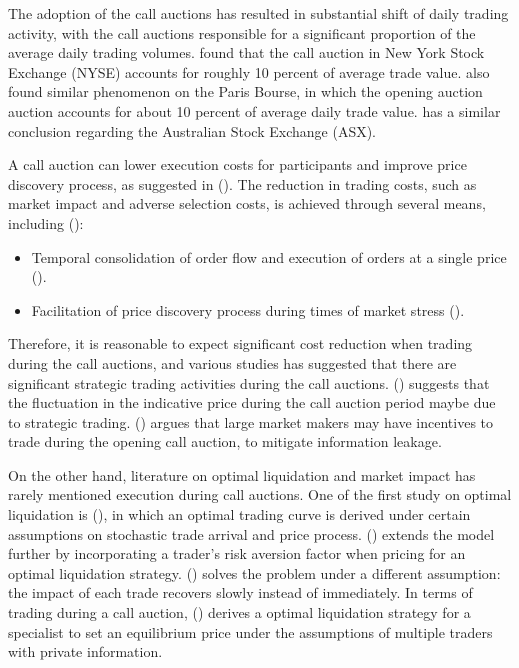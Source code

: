 \documentclass{article}
\begin{document}
The adoption of the call auctions has resulted in substantial shift of daily trading activity, with the call auctions responsible for a significant proportion of the average daily trading volumes. \cite{Madhavan2015} found that the call auction in New York Stock Exchange (NYSE) accounts for roughly 10 percent of average trade value. \cite{Bruno1999} also found similar phenomenon on the Paris Bourse, in which the opening auction auction accounts for about 10 percent of average daily trade value. \cite{Carole2006} has a similar conclusion regarding the Australian Stock Exchange (ASX).

A call auction can lower execution costs for participants and improve price discovery process, as suggested in (\cite{Pagano2003}). The reduction in trading costs, such as market impact and adverse selection costs, is achieved through several means, including (\cite{Carole2006}):
\begin{itemize}
\item Temporal consolidation of order flow and execution of orders at a single price (\cite{Economides1995}).
\item Facilitation of price discovery process during times of market stress (\cite{Madhavan1992}).
\end{itemize}

Therefore, it is reasonable to expect significant cost reduction when trading during the call auctions, and various studies has suggested that there are significant strategic trading activities during the call auctions. (\cite{Bruno1999}) suggests that the fluctuation in the indicative price during the call auction period maybe due to strategic trading. (\cite{Vives2001}) argues that large market makers may have incentives to trade during the opening call auction, to mitigate information leakage.

On the other hand, literature on optimal liquidation and market impact has rarely mentioned execution during call auctions. One of the first study on optimal liquidation is (\cite{HoStoll1981}), in which an optimal trading curve is derived under certain assumptions on stochastic trade arrival and price process. (\cite{AlmgrenChriss2000}) extends the model further by incorporating a trader's risk aversion factor when pricing for an optimal liquidation strategy. (\cite{Obizhaeva2013}) solves the problem under a different assumption: the impact of each trade recovers slowly instead of immediately. In terms of trading during a call auction, (\cite{Madhavan2015}) derives a optimal liquidation strategy for a specialist to set an equilibrium price under the assumptions of multiple traders with private information. 
\end{document}
